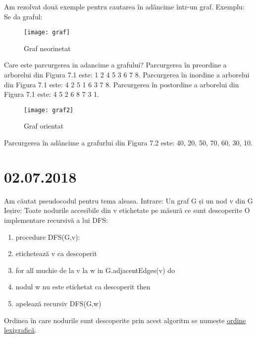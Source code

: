 \documentclass{report}
\begin{document}
Am rezolvat două exemple pentru cautarea în adâncime  într-un graf.
Exemplu: 
Se da graful: \newline
\begin{figure}[ht]
\centering
\texttt{[image: graf]}
\caption{Graf neorinetat}
\end{figure}
Care este parcurgerea in adancime a grafului?\newline
Parcurgerea în preordine a arborelui din Figura 7.1 este: 1 2 4 5 3 6 7 8. \newline
Parcurgerea în inordine a arborelui din Figura 7.1 este: 4 2 5 1 6 3 7 8. \newline
Parcurgerea în postordine a arborelui din Figura 7.1 este: 4 5 2 6 8 7 3 1. 
\begin{figure}[ht]
\centering
\texttt{[image: graf2]}
\caption{Graf orientat}
\end{figure}
\newline
Parcurgerea în adâncime a grafurlui din Figura 7.2 este: 40, 20, 50, 70, 60, 30, 10.

\chapter{02.07.2018}
Am căutat pseudocodul pentru tema aleasa.\newline
\hspace*{0.5cm}Intrare: Un graf G și un nod v din G\newline
\hspace*{0.5cm}Ieșire: Toate nodurile accesibile din v etichetate pe măsură ce sunt descoperite\newline
\hspace*{0.5cm}O implementare recursivă a lui DFS:\newline
\begin{enumerate}
\item procedure DFS(G,v):
\item  etichetează v ca descoperit
\item  for all muchie de la v la w in G.adjacentEdges(v) do
\item    \hspace*{1cm} nodul w nu este etichetat ca descoperit then
\item     \hspace{1cm}apelează recursiv DFS(G,w)
\end{enumerate}
\hspace*{0.5cm}Ordinea în care nodurile sunt descoperite prin acest algoritm se numește \underline{ordine lexigrafică}.
\end{document}
